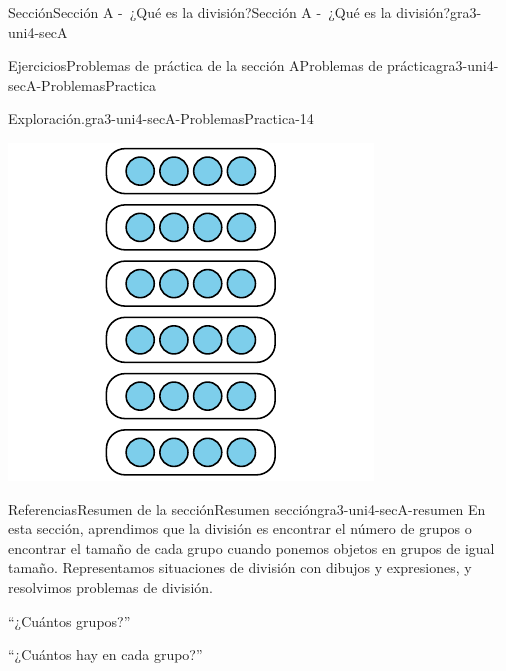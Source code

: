 \documentclass[twoside,10pt,]{article}
\begin{document}
\begin{sectionptx}{Sección}{Sección A -~¿Qué es la división?}{}{Sección A -~¿Qué es la división?}{}{}{gra3-uni4-secA}
\begin{exercises-subsection}{Ejercicios}{Problemas de práctica de la sección A}{}{Problemas de práctica}{}{}{gra3-uni4-secA-ProblemasPractica}
\begin{divisionexercise}{12}{Exploración.}{}{gra3-uni4-secA-ProblemasPractica-14}
\begin{sidebyside}{6}{0.00333333333333333}{0.00333333333333333}{0.00666666666666667}
\begin{sbspanel}{0.3}
\includegraphics[width=\linewidth]{external/svg-source/tikz-file-151676.pdf}
\end{sbspanel}%
\end{sidebyside}%
\end{divisionexercise}%
\end{exercises-subsection}
%
%
\typeout{************************************************}
\typeout{************************************************}
%
\begin{references-subsection}{Referencias}{Resumen de la sección}{}{Resumen sección}{}{}{gra3-uni4-secA-resumen}
En esta sección, aprendimos que la división es encontrar el número de grupos o encontrar el tamaño de cada grupo cuando ponemos objetos en grupos de igual tamaño. Representamos situaciones de división con dibujos y expresiones, y resolvimos problemas de división.%
\begin{sidebyside}{2}{0.025}{0.025}{0.05}%
\begin{sbspanel}{0.45}%
``¿Cuántos grupos?''%
\end{sbspanel}%
\begin{sbspanel}{0.45}%
\par
``¿Cuántos hay en cada grupo?''%
\end{sbspanel}%
\end{sidebyside}%
\begin{sidebyside}{2}{0.025}{0.025}{0.05}%

\end{sidebyside}
\end{references-subsection}
\end{sectionptx}
\end{document}
